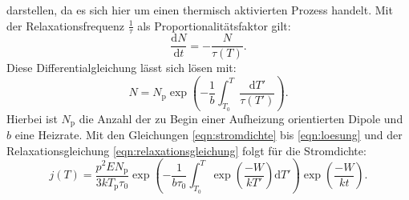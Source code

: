 darstellen, da es sich hier um einen thermisch aktivierten Prozess handelt.
Mit der Relaxationsfrequenz $\frac{1}{\tau}$ als Proportionalitätsfaktor gilt:
\begin{equation}
  \frac{\mathrm{d}N}{\mathrm{d}t}=-\frac{N}{\tau(T)}\label{eqn:dgl}.
\end{equation}
Diese Differentialgleichung lässt sich lösen mit:
\begin{equation}
  N= N_\mathrm{p}\exp\left({-\frac{1}{b}\int_{T_\mathrm{0}}^{T} \frac{\mathrm{d}T'}{\tau(T')}}\right)\label{eqn:loesung}.
\end{equation}
Hierbei ist $N_\mathrm{p}$ die Anzahl der zu Begin einer Aufheizung orientierten Dipole und
$b$ eine Heizrate. Mit den Gleichungen \eqref{eqn:stromdichte} bis \eqref{eqn:loesung}
und der Relaxationsgleichung \eqref{eqn:relaxationsgleichung} folgt für die Stromdichte:
\begin{equation}
j(T)=\frac{p^2EN_\mathrm{p}}{3kT_\mathrm{p}\tau_{0}}\exp\left(-\frac{1}{b\tau_\mathrm{0}}\int_{T_\mathrm{0}}^{T}\exp\left(\frac{-W}{kT'}\right)\mathrm{d}T'\right)\exp\left(\frac{-W}{kt}\right). \label{eqn:8}
\end{equation}
